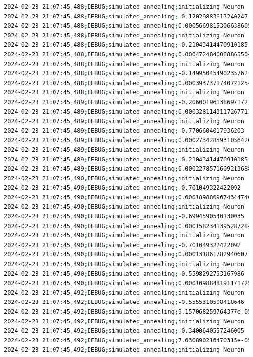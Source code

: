 \documentclass{article}
\begin{document}
\begin{lstlisting}[language=bash, caption=Example Output of Program]
2024-02-28 21:07:45,488;DEBUG;simulated_annealing;initializing Neuron
2024-02-28 21:07:45,488;DEBUG;simulated_annealing;-0.12029883613240247
2024-02-28 21:07:45,488;DEBUG;simulated_annealing;0.0005669815306638605
2024-02-28 21:07:45,488;DEBUG;simulated_annealing;initializing Neuron
2024-02-28 21:07:45,488;DEBUG;simulated_annealing;-0.21043414470910185
2024-02-28 21:07:45,488;DEBUG;simulated_annealing;0.00047248460888655046
2024-02-28 21:07:45,488;DEBUG;simulated_annealing;initializing Neuron
2024-02-28 21:07:45,488;DEBUG;simulated_annealing;-0.14995045490235762
2024-02-28 21:07:45,488;DEBUG;simulated_annealing;0.0003937371740721254
2024-02-28 21:07:45,488;DEBUG;simulated_annealing;initializing Neuron
2024-02-28 21:07:45,489;DEBUG;simulated_annealing;-0.20600196138697172
2024-02-28 21:07:45,489;DEBUG;simulated_annealing;0.00032811431172677114
2024-02-28 21:07:45,489;DEBUG;simulated_annealing;initializing Neuron
2024-02-28 21:07:45,489;DEBUG;simulated_annealing;-0.7706604017936203
2024-02-28 21:07:45,489;DEBUG;simulated_annealing;0.00027342859310564265
2024-02-28 21:07:45,489;DEBUG;simulated_annealing;initializing Neuron
2024-02-28 21:07:45,489;DEBUG;simulated_annealing;-0.21043414470910185
2024-02-28 21:07:45,489;DEBUG;simulated_annealing;0.00022785716092136888
2024-02-28 21:07:45,490;DEBUG;simulated_annealing;initializing Neuron
2024-02-28 21:07:45,490;DEBUG;simulated_annealing;-0.701049322422092
2024-02-28 21:07:45,490;DEBUG;simulated_annealing;0.00018988096743447407
2024-02-28 21:07:45,490;DEBUG;simulated_annealing;initializing Neuron
2024-02-28 21:07:45,490;DEBUG;simulated_annealing;-0.6994590540130035
2024-02-28 21:07:45,490;DEBUG;simulated_annealing;0.0001582341395287284
2024-02-28 21:07:45,490;DEBUG;simulated_annealing;initializing Neuron
2024-02-28 21:07:45,490;DEBUG;simulated_annealing;-0.701049322422092
2024-02-28 21:07:45,490;DEBUG;simulated_annealing;0.000131861782940607
2024-02-28 21:07:45,490;DEBUG;simulated_annealing;initializing Neuron
2024-02-28 21:07:45,490;DEBUG;simulated_annealing;-0.5598292753167986
2024-02-28 21:07:45,490;DEBUG;simulated_annealing;0.00010988481911717251
2024-02-28 21:07:45,492;DEBUG;simulated_annealing;initializing Neuron
2024-02-28 21:07:45,492;DEBUG;simulated_annealing;-0.5555310508418646
2024-02-28 21:07:45,492;DEBUG;simulated_annealing;9.157068259764377e-05
2024-02-28 21:07:45,492;DEBUG;simulated_annealing;initializing Neuron
2024-02-28 21:07:45,492;DEBUG;simulated_annealing;-0.3400640557246005
2024-02-28 21:07:45,492;DEBUG;simulated_annealing;7.630890216470315e-05
2024-02-28 21:07:45,492;DEBUG;simulated_annealing;initializing Neuron

\end{lstlisting}
\end{document}
